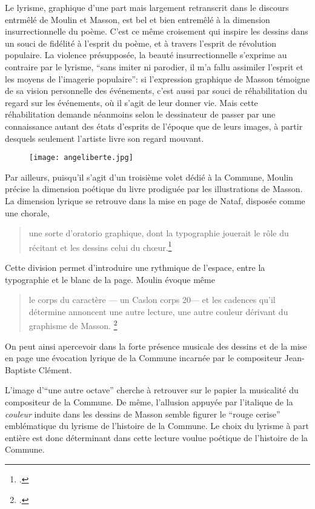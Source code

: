 Le lyrisme, graphique d'une part mais largement retranscrit dans le discours entrmêlé de Moulin et Masson, est bel et bien entremêlé à la dimension insurrectionnelle du poème. C’est ce même croisement qui inspire les dessins dans un souci de fidélité à l’esprit du poème, et à travers l’esprit de révolution populaire. La violence présupposée, la beauté insurrectionnelle s’exprime au contraire par le lyrisme, \enquote{sans imiter ni parodier, il m’a fallu assimiler l’esprit et les moyens de l’imagerie populaire}: si l’expression graphique de Masson témoigne de sa vision personnelle des événements, c’est aussi par souci de réhabilitation du regard sur les événements, où il s’agit de leur donner vie. Mais cette réhabilitation demande néanmoins selon le dessinateur de passer par une connaissance autant des états d’esprits de l’époque que de leurs images, à partir desquels seulement l’artiste livre son regard mouvant. 

\begin{figure}[H]
   \centering
   \texttt{[image: angeliberte.jpg]}
	\caption{\cite{commune}}\label{fig:Angecommunard}
\end{figure}

Par ailleurs, puisqu’il s’agit d’un troisième volet dédié à la Commune, Moulin précise la dimension poétique du livre prodiguée par les illustrations de Masson. La dimension lyrique se retrouve dans la mise en page de Nataf, disposée comme une chorale, 
\begin{quote}
une sorte d’oratorio graphique, dont la typographie jouerait le rôle du récitant et les dessins celui du ch\oe{}ur.\footcite{courbetcommunard}\end{quote}

 Cette division permet d’introduire une rythmique de l’espace, entre la typographie et le blanc de la page. Moulin évoque même 
 \begin{quote}
le corps du caractère — un Caslon corps 20— et les cadences qu’il détermine annoncent une autre lecture, une autre couleur dérivant du graphisme de Masson. 	 
 \footcite{commune}\end{quote}

 On peut ainsi apercevoir dans la forte présence musicale des dessins et de la mise en page une évocation lyrique de la Commune incarnée par le compositeur Jean-Baptiste Clément. 

L’image d'\enquote{une autre octave} cherche à retrouver sur le papier la musicalité du compositeur de la Commune. De même, l’allusion appuyée par l’italique de la \emph{couleur} induite dans les dessins de Masson semble figurer  le \enquote{rouge cerise} emblématique du lyrisme de l’histoire de la Commune. Le choix du lyrisme à part entière est donc déterminant dans cette lecture voulue poétique de l’histoire de la Commune. 

